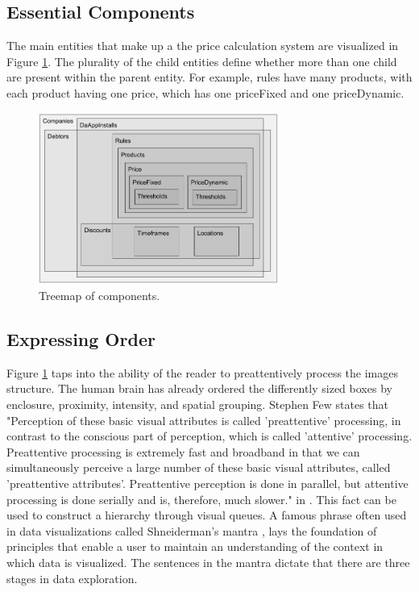 \subsection{Essential Components}
The main entities that make up a the price calculation system are visualized in Figure \ref{fig:Treemap}. The plurality of the child entities define whether more than one child are present within the parent entity. For example, rules have many products, with each product having one price, which has one priceFixed and one priceDynamic.

\begin{figure}[H]
	\centering
	\includegraphics[width=0.7\textwidth]{Treemap}
	\caption[Treemap of Components]{Treemap of components.}
	\label{fig:Treemap}
\end{figure}

\subsection{Expressing Order}
Figure \ref{fig:Treemap} taps into the ability of the reader to preattentively process the images structure. The human brain has already ordered the differently sized boxes by enclosure, proximity, intensity, and spatial grouping. Stephen Few states that "Perception of these basic visual attributes is called 'preattentive' processing, in contrast to the conscious part of perception, which is called 'attentive' processing. Preattentive processing is extremely fast and broadband in that we can simultaneously perceive a large number of these basic visual attributes, called 'preattentive attributes'. Preattentive perception is done in parallel, but attentive processing is done serially and is, therefore, much slower." in \cite[p.~3]{few}. This fact can be used to construct a hierarchy through visual queues. A famous phrase often used in data visualizations called Shneiderman's mantra \cite{mantra}, lays the foundation of principles that enable a user to maintain an understanding of the context in which data is visualized. The sentences in the mantra dictate that there are three stages in data exploration.

